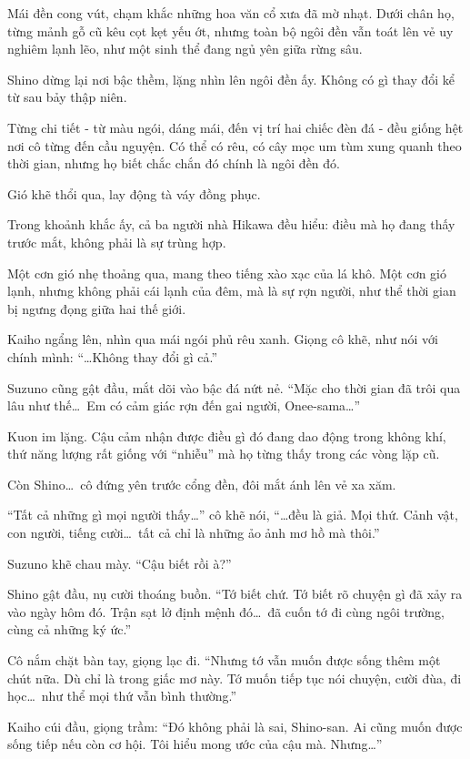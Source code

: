 \documentclass[../main.tex]{subfiles}
\begin{document}
Mái đền cong vút, chạm khắc những hoa văn cổ xưa đã mờ nhạt. Dưới chân họ, từng mảnh gỗ cũ kêu cọt kẹt yếu ớt, nhưng toàn bộ ngôi đền vẫn toát lên vẻ uy nghiêm lạnh lẽo, như một sinh thể đang ngủ yên giữa rừng sâu.

Shino dừng lại nơi bậc thềm, lặng nhìn lên ngôi đền ấy. Không có gì thay đổi kể từ sau bảy thập niên.

Từng chi tiết - từ màu ngói, dáng mái, đến vị trí hai chiếc đèn đá - đều giống hệt nơi cô từng đến cầu nguyện. Có thể có rêu, có cây mọc um tùm xung quanh theo thời gian, nhưng họ biết chắc chắn đó chính là ngôi đền đó.

Gió khẽ thổi qua, lay động tà váy đồng phục.

Trong khoảnh khắc ấy, cả ba người nhà Hikawa đều hiểu: điều mà họ đang thấy trước mắt, không phải là sự trùng hợp.

Một cơn gió nhẹ thoảng qua, mang theo tiếng xào xạc của lá khô. Một cơn gió lạnh, nhưng không phải cái lạnh của đêm, mà là sự rợn người, như thể thời gian bị ngưng đọng giữa hai thế giới.


Kaiho ngẩng lên, nhìn qua mái ngói phủ rêu xanh. Giọng cô khẽ, như nói với chính mình: ``\dots Không thay đổi gì cả.''

Suzuno cũng gật đầu, mắt dõi vào bậc đá nứt nẻ. ``Mặc cho thời gian đã trôi qua lâu như thế\dots\ Em có cảm giác rợn đến gai người, Onee-sama\dots''

Kuon im lặng. Cậu cảm nhận được điều gì đó đang dao động trong không khí, thứ năng lượng rất giống với ``nhiễu'' mà họ từng thấy trong các vòng lặp cũ.

Còn Shino\dots\ cô đứng yên trước cổng đền, đôi mắt ánh lên vẻ xa xăm.

``Tất cả những gì mọi người thấy\dots'' cô khẽ nói, ``\dots đều là giả. Mọi thứ. Cảnh vật, con người, tiếng cười\dots\ tất cả chỉ là những ảo ảnh mơ hồ mà thôi.''

Suzuno khẽ chau mày. ``Cậu biết rồi à?''

Shino gật đầu, nụ cười thoáng buồn. ``Tớ biết chứ. Tớ biết rõ chuyện gì đã xảy ra vào ngày hôm đó. Trận sạt lở định mệnh đó\dots\ đã cuốn tớ đi cùng ngôi trường, cùng cả những ký ức.''

Cô nắm chặt bàn tay, giọng lạc đi. ``Nhưng tớ vẫn muốn được sống thêm một chút nữa. Dù chỉ là trong giấc mơ này. Tớ muốn tiếp tục nói chuyện, cười đùa, đi học\dots\ như thể mọi thứ vẫn bình thường.''

Kaiho cúi đầu, giọng trầm: ``Đó không phải là sai, Shino-san. Ai cũng muốn được sống tiếp nếu còn cơ hội. Tôi hiểu mong ước của cậu mà. Nhưng\dots''
\end{document}
